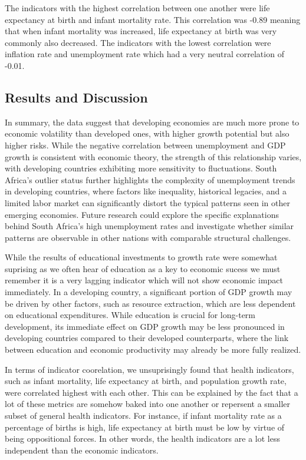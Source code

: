 \documentclass[
  letterpaper,
  DIV=11,
  numbers=noendperiod]{scrartcl}
\begin{document}
The indicators with the highest correlation between one another were
life expectancy at birth and infant mortality rate. This correlation was
-0.89 meaning that when infant mortality was increased, life expectancy
at birth was very commonly also decreased. The indicators with the
lowest correlation were inflation rate and unemployment rate which had a
very neutral correlation of -0.01.

\subsection{Results and Discussion}\label{results-and-discussion}

In summary, the data suggest that developing economies are much more
prone to economic volatility than developed ones, with higher growth
potential but also higher risks. While the negative correlation between
unemployment and GDP growth is consistent with economic theory, the
strength of this relationship varies, with developing countries
exhibiting more sensitivity to fluctuations. South Africa's outlier
status further highlights the complexity of unemployment trends in
developing countries, where factors like inequality, historical
legacies, and a limited labor market can significantly distort the
typical patterns seen in other emerging economies. Future research could
explore the specific explanations behind South Africa's high
unemployment rates and investigate whether similar patterns are
observable in other nations with comparable structural challenges.

While the results of educational investments to growth rate were
somewhat suprising as we often hear of education as a key to economic
sucess we must remember it is a very lagging indicator which will not
show economic impact immediately. In a developing country, a significant
portion of GDP growth may be driven by other factors, such as resource
extraction, which are less dependent on educational expenditures. While
education is crucial for long-term development, its immediate effect on
GDP growth may be less pronounced in developing countries compared to
their developed counterparts, where the link between education and
economic productivity may already be more fully realized.

In terms of indicator coorelation, we unsuprisingly found that health
indicators, such as infant mortality, life expectancy at birth, and
population growth rate, were correlated highest with each other. This
can be explained by the fact that a lot of these metrics are somehow
baked into one another or repersent a smaller subset of general health
indicators. For instance, if infant mortality rate as a percentage of
births is high, life expectancy at birth must be low by virtue of being
oppositional forces. In other words, the health indicators are a lot
less independent than the economic indicators.
\end{document}
